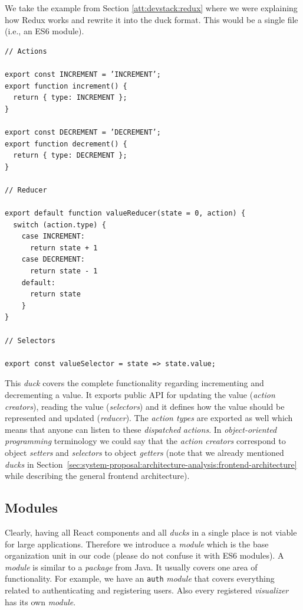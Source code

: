 We take the example from Section \ref{att:devstack:redux} where we were explaining how Redux works and rewrite it into the duck format. This would be a single file (i.e., an ES6 module).

\begin{verbatim}
// Actions 

export const INCREMENT = ’INCREMENT’;
export function increment() {
  return { type: INCREMENT };
}

export const DECREMENT = ’DECREMENT’;
export function decrement() {
  return { type: DECREMENT };
}

// Reducer

export default function valueReducer(state = 0, action) {
  switch (action.type) {
    case INCREMENT:
      return state + 1
    case DECREMENT:
      return state - 1
    default:
      return state
    }
}

// Selectors

export const valueSelector = state => state.value;
\end{verbatim}

This \emph{duck} covers the complete functionality regarding incrementing and decrementing a value. It exports public API for updating the value (\emph{action creators}), reading the value (\emph{selectors}) and it defines how the value should be represented and updated (\emph{reducer}). The \emph{action types} are exported as well which means that anyone can listen to these \emph{dispatched} \emph{actions}. In \emph{object-oriented programming} terminology we could say that the \emph{action creators} correspond to object \emph{setters} and \emph{selectors} to object \emph{getters} (note that we already mentioned \emph{ducks} in Section~\ref{sec:system-proposal:architecture-analysis:frontend-architecture} while describing the general frontend architecture).

\subsection{Modules}

Clearly, having all React components and all \emph{ducks} in a single place is not viable for large applications. Therefore we introduce a \emph{module} which is the base organization unit in our code (please do not confuse it with ES6 modules). A \emph{module} is similar to a \emph{package} from Java. It usually covers one area of functionality. For example, we have an \texttt{auth} \emph{module} that covers everything related to authenticating and registering users. Also every registered \emph{visualizer} has its own \emph{module}.

